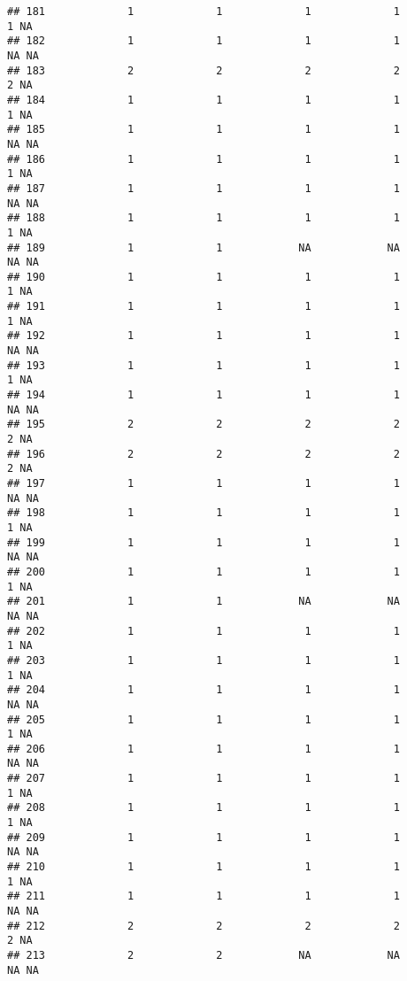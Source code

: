 \documentclass[
]{article}
\begin{document}
\begin{verbatim}
## 181             1             1             1             1             1 NA
## 182             1             1             1             1            NA NA
## 183             2             2             2             2             2 NA
## 184             1             1             1             1             1 NA
## 185             1             1             1             1            NA NA
## 186             1             1             1             1             1 NA
## 187             1             1             1             1            NA NA
## 188             1             1             1             1             1 NA
## 189             1             1            NA            NA            NA NA
## 190             1             1             1             1             1 NA
## 191             1             1             1             1             1 NA
## 192             1             1             1             1            NA NA
## 193             1             1             1             1             1 NA
## 194             1             1             1             1            NA NA
## 195             2             2             2             2             2 NA
## 196             2             2             2             2             2 NA
## 197             1             1             1             1            NA NA
## 198             1             1             1             1             1 NA
## 199             1             1             1             1            NA NA
## 200             1             1             1             1             1 NA
## 201             1             1            NA            NA            NA NA
## 202             1             1             1             1             1 NA
## 203             1             1             1             1             1 NA
## 204             1             1             1             1            NA NA
## 205             1             1             1             1             1 NA
## 206             1             1             1             1            NA NA
## 207             1             1             1             1             1 NA
## 208             1             1             1             1             1 NA
## 209             1             1             1             1            NA NA
## 210             1             1             1             1             1 NA
## 211             1             1             1             1            NA NA
## 212             2             2             2             2             2 NA
## 213             2             2            NA            NA            NA NA

\end{verbatim}
\end{document}
